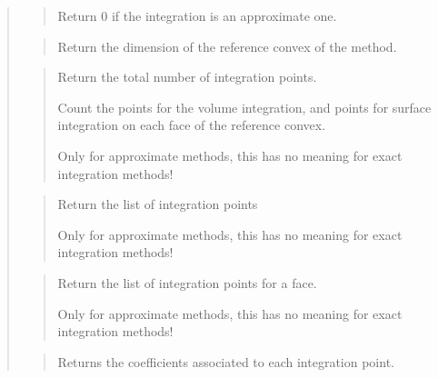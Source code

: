 \documentclass[a4paper,11pt,english]{sphinxmanual}
\begin{document}
\begin{quote}

\begin{quote}

Return 0 if the integration is an approximate one.
\end{quote}

\begin{quote}

Return the dimension of the reference convex of
the method.
\end{quote}

\begin{quote}

Return the total number of integration points.

Count the points for the volume integration, and points for
surface integration on each face of the reference convex.

Only for approximate methods, this has no meaning for exact
integration methods!
\end{quote}

\begin{quote}

Return the list of integration points

Only for approximate methods, this has no meaning for exact
integration methods!
\end{quote}

\begin{quote}

Return the list of integration points for a face.

Only for approximate methods, this has no meaning for exact
integration methods!
\end{quote}

\begin{quote}

Returns the coefficients associated to each integration point.


\end{quote}
\end{quote}
\end{document}
